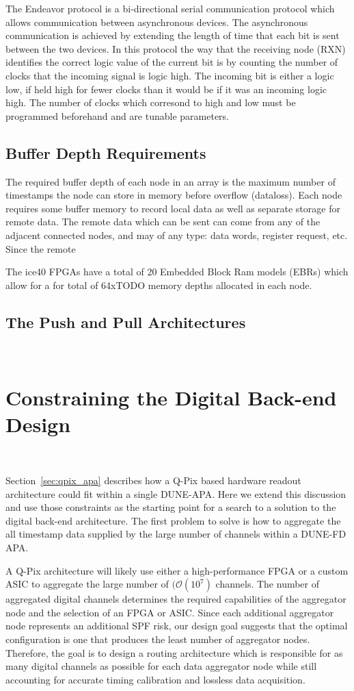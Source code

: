 The Endeavor protocol is a bi-directional serial communication protocol which allows communication between asynchronous devices.
The asynchronous communication is achieved by extending the length of time that each bit is sent between the two devices.
In this protocol the way that the receiving node (RXN) identifies the correct logic value of the current bit is by counting the number of clocks that the incoming signal is logic high.
The incoming bit is either a logic low, if held high for fewer clocks than it would be if it was an incoming logic high.
The number of clocks which corresond to high and low must be programmed beforehand and are tunable parameters.

\subsection{Buffer Depth Requirements}

The required buffer depth of each node in an array is the maximum number of timestamps the node can store in memory before overflow (dataloss).
Each node requires some buffer memory to record local data as well as separate storage for remote data.
The remote data which can be sent can come from any of the adjacent connected nodes, and may of any type: data words, register request, etc.
Since the remote

The ice40 FPGAs have a total of 20 Embedded Block Ram models (EBRs) which allow for a for total of 64xTODO memory depths allocated in each node.

\subsection{The Push and Pull Architectures}~\label{sec:architectures}

\section{Constraining the Digital Back-end Design}~\label{sec:digital_constraints}

Section~\ref{sec:qpix_apa} describes how a Q-Pix based hardware readout architecture could fit within a single DUNE-APA.
Here we extend this discussion and use those constraints as the starting point for a search to a solution to the digital back-end architecture.
The first problem to solve is how to aggregate the all timestamp data supplied by the large number of channels within a DUNE-FD APA.

A Q-Pix architecture will likely use either a high-performance FPGA or a custom ASIC to aggregate the large number of $(\mathcal{O}(10^{7})$ channels.
The number of aggregated digital channels determines the required capabilities of the aggregator node and the selection of an FPGA or ASIC.
Since each additional aggregator node represents an additional SPF risk, our design goal suggests that the optimal configuration is one that produces the least number of aggregator nodes.
Therefore, the goal is to design a routing architecture which is responsible for as many digital channels as possible for each data aggregator node while still accounting for accurate timing calibration and lossless data acquisition.

